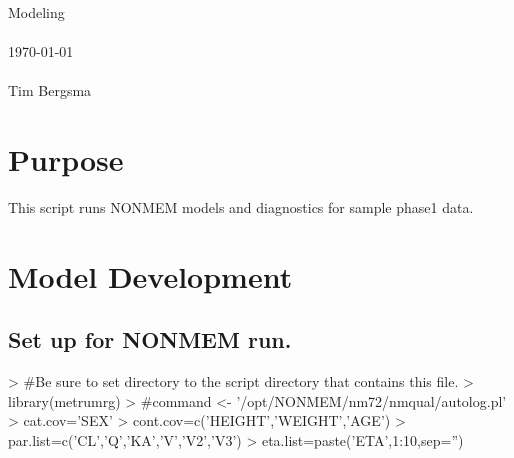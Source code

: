 
\usepackage{Sweave}

 

\vspace*{2cm}
\begin{center}
{\Large Modeling}\\
~\\
\today\\
~\\
Tim Bergsma\\
\end{center}
\newpage

\section{Purpose}
This script runs NONMEM models and diagnostics for sample phase1 data.
\section{Model Development}
\subsection{Set up for NONMEM run.}
\begin{Schunk}
\begin{Sinput}
> #Be sure to set directory to the script directory that contains this file.
> library(metrumrg)
> #command <- '/opt/NONMEM/nm72/nmqual/autolog.pl'
> cat.cov='SEX'
> cont.cov=c('HEIGHT','WEIGHT','AGE')
> par.list=c('CL','Q','KA','V','V2','V3')
> eta.list=paste('ETA',1:10,sep='')
\end{Sinput}
\end{Schunk}
